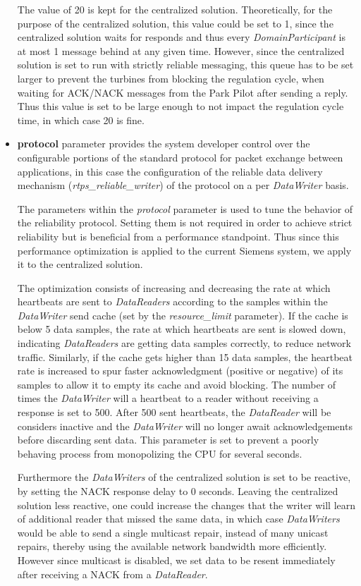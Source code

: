 \begin{itemize}
	The value of 20 is kept for the centralized solution. Theoretically, for the purpose of the centralized solution, this value could be set to 1, since the centralized solution waits for responds and thus every \textit{DomainParticipant} is at most 1 message behind at any given time. However, since the centralized solution is set to run with strictly reliable messaging, this queue has to be set larger to prevent the turbines from blocking the regulation cycle, when waiting for ACK/NACK messages from the Park Pilot after sending a reply. Thus this value is set to be large enough to not impact the regulation cycle time, in which case 20 is fine. 
	\item \textbf{protocol} parameter provides the system developer control over the configurable portions of the standard protocol for packet exchange between applications, in this case the configuration of the reliable data delivery mechanism (\textit{rtps\_reliable\_writer}) of the protocol on a per \textit{DataWriter} basis. 
	
	The parameters within the \textit{protocol} parameter is used to tune the behavior of the reliability protocol. Setting them is not required in order to achieve strict reliability but is beneficial from a performance standpoint. Thus since this performance optimization is applied to the current Siemens system, we apply it to the centralized solution.
	
	The optimization consists of increasing and decreasing the rate at which heartbeats are sent to \textit{DataReaders} according to the samples within the \textit{DataWriter} send cache (set by the \textit{resource\_limit} parameter). If the cache is below 5 data samples, the rate at which heartbeats are sent is slowed down, indicating \textit{DataReaders} are getting data samples correctly, to reduce network traffic. Similarly, if the cache gets higher than 15 data samples, the heartbeat rate is increased to spur faster acknowledgment (positive or negative) of its samples to allow it to empty its cache and avoid blocking. The number of times the \textit{DataWriter} will a heartbeat to a reader without receiving a response is set to 500. After 500 sent heartbeats, the \textit{DataReader} will be considers inactive and the \textit{DataWriter} will no longer await acknowledgements before discarding sent data. This parameter is set to prevent a poorly behaving process from monopolizing the CPU for several seconds.
	
	Furthermore the \textit{DataWriters} of the centralized solution is set to be reactive, by setting the NACK response delay to 0 seconds. Leaving the centralized solution less reactive, one could increase the changes that the writer will learn of additional reader that missed the same data, in which case \textit{DataWriters} would be able to send a single multicast repair, instead of many unicast repairs, thereby using the available network bandwidth more efficiently. However since multicast is disabled, we set data to be resent immediately after receiving a NACK from a \textit{DataReader}. 
	

\end{itemize}
